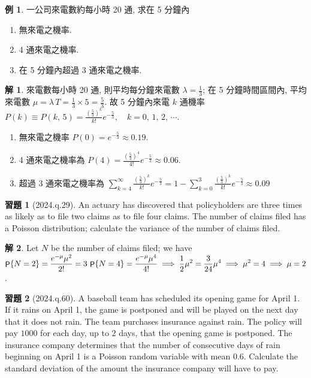 \documentclass[12pt]{extarticle}
\newcommand{\ds}{\displaystyle}
\newcommand{\ie}{\;\Longrightarrow\;}
\DeclareMathOperator\prb{{\sf P}}
\theoremstyle{definition}
\newtheorem*{ex}{例}
\newtheorem*{sol}{解}
\newtheorem*{exe}{習題}
\newcommand{\myline}{\noindent\makebox[\linewidth]{\rule{\paperwidth}{0.4pt}}}
\begin{document}
\begin{ex} 一公司來電數約每小時 20 通, 求在 5 分鐘內
  \setlength{\columnsep}{-1cm}
  \begin{multicols}{3}
    \begin{enumerate}[label=(\alph*)]\setlength{\itemsep}{0pt}
      \item 無來電之機率.
      \item 4 通來電之機率. 
      \item 在 5 分鐘內超過 3 通來電之機率.
    \end{enumerate}
  \end{multicols}
\end{ex}

\begin{sol}
  來電數每小時 20 通, 則平均每分鐘來電數 $\lambda = \frac{1}{3}$; 在 5 分鐘時間區間內, 平均來電數 $\mu = \lambda\,T = \frac{1}{3}\times 5 = \frac{5}{3}$. 故 5 分鐘內來電 $k$ 通機率 $\ds P(k)\equiv P(k,\,5) = \frac{(\frac{5}{3})^k}{k!} e^{-\frac{5}{3}},\quad k=0,\,1,\,2,\,\cdots$.  
  \begin{enumerate}[label=(\alph*)]\setlength{\itemsep}{0pt}
    \item 無來電之機率 $\ds P(0)= e^{-\frac{5}{3}}\approx 0.19$.
    \item 4 通來電之機率為 $\ds P(4)=\frac{(\frac{5}{3})^4}{4!}e^{-\frac{5}{3}}\approx 0.06$. 
    \item 超過 3 通來電之機率為 $\ds\sum_{k=4}^{\infty}\frac{(\frac{5}{3})^k}{k!} e^{-\frac{5}{3}} = 1 - \sum_{k = 0}^3\frac{(\frac{5}{3})^k}{k!}e^{-\frac{5}{3}}\approx 0.09$
  \end{enumerate}
\end{sol}

\myline

\begin{exe}[2024.q.29]
  An actuary has discovered that policyholders are three times as likely as to file two claims as to file four claims. The number of claims filed has a Poisson distribution; calculate the variance of the number of claims filed.
\end{exe}

\begin{sol}
  Let $N$ be the number of claims filed; we have $\ds\prb\{N = 2\} = \frac{e^{-\mu}\mu^2}{2!} = 3\,\prb\{N = 4\} = \frac{e^{-\mu}\mu^4}{4!} \ie \frac{1}{2}\mu^2 = \frac{3}{24}\mu^4 \ie \mu^2 = 4 \ie \mu = 2$. 
\end{sol}

\begin{exe}[2024.q.60]
  A baseball team has scheduled its opening game for April 1. If it rains on April 1, the game is postponed and will be played on the next day that it does not rain. The team purchases insurance against rain. The policy will pay $1000$ for each day, up to $2$ days, that the opening game is postponed. The insurance company determines that the number of consecutive days of rain beginning on April 1 is a Poisson random variable with mean $0.6$. Calculate the standard deviation of the amount the insurance company will have to pay.
\end{exe}
\end{document}
